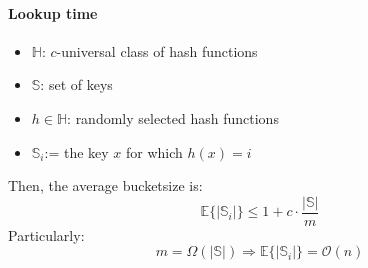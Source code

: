 \documentclass[12pt, a4paper]{scrartcl}
\newcommand{\bigO}{\mathcal{O}}
\begin{document}
\paragraph{Lookup time}
\begin{itemize}
\item $\mathbb{H}$: $c$-universal class of hash functions
\item $\mathbb{S}$: set of keys
\item $h\in\mathbb{H}$: randomly selected hash functions
\item $\mathbb{S}_i$:= the key $x$ for which $h(x)=i$
\end{itemize}
Then, the average bucketsize is:
\begin{equation}
  \mathbb{E}\{|\mathbb{S}_i|\}\le 1+c\cdot\frac{|\mathbb{S}|}{m}
\end{equation}
Particularly:
\begin{equation}
  m=\Omega(|\mathbb{S}|)\Rightarrow\mathbb{E}\{|\mathbb{S}_i|\}=\bigO(n)
\end{equation}
\end{document}
